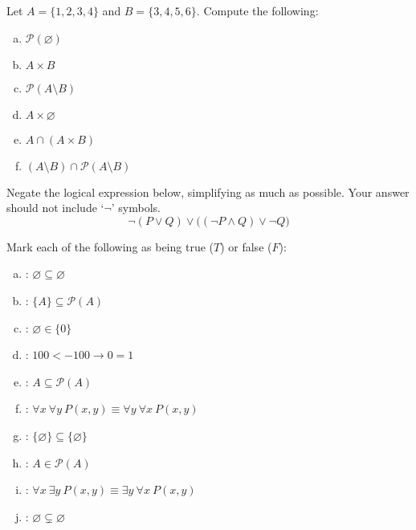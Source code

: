 \documentclass[12pt,letterpaper]{exam}
\begin{document}
\begin{questions}
\newpage
\question[10] Let $A= \{ 1, 2, 3, 4 \}$ and $B= \{ 3, 4, 5, 6 \}$. Compute the following:
	\begin{enumerate}[(a)]
	\item $\mathcal{P}(\varnothing)$
	\item $A \times B$
	\item $\mathcal{P}(A \setminus B)$
	\item $A \times \varnothing$
	\item $A \cap (A \times B)$
	\item $(A \setminus B) \cap \mathcal{P}(A \setminus B)$
	\end{enumerate}



\newpage
\question[10] Negate the logical expression below, simplifying as much as possible. Your answer should not include `$\neg$' symbols. 
	\[
	\neg(P \vee Q) \vee \big( (\neg P \wedge Q) \vee \neg Q \big)
	\]



\newpage
\question[10] Mark each of the following as being true ($T$) or false ($F$): \pspace
        \begin{enumerate}[(a)]
        \item \underline{\hspace{1.5cm}}: $\varnothing \subseteq \varnothing$ \vfill
        \item \underline{\hspace{1.5cm}}: $\{ A \} \subseteq \mathcal{P}(A)$ \vfill
        \item \underline{\hspace{1.5cm}}: $\varnothing \in \{ 0 \}$ \vfill
        \item \underline{\hspace{1.5cm}}: $100 < -100 \to 0= 1$ \vfill
        \item \underline{\hspace{1.5cm}}: $A \subseteq \mathcal{P}(A)$ \vfill
        \item \underline{\hspace{1.5cm}}: $\forall x\ \forall y\ P(x, y) \equiv \forall y\ \forall x\ P(x, y)$ \vfill
        \item \underline{\hspace{1.5cm}}: $\{ \varnothing \} \subseteq \{ \varnothing \}$ \vfill
        \item \underline{\hspace{1.5cm}}: $A \in \mathcal{P}(A)$ \vfill
        \item \underline{\hspace{1.5cm}}: $\forall x\ \exists y\ P(x, y) \equiv \exists y\ \forall x\ P(x, y)$ \vfill
        \item \underline{\hspace{1.5cm}}: $\varnothing \subsetneq \varnothing$ \vfill
        \end{enumerate}


\end{questions}
\end{document}
